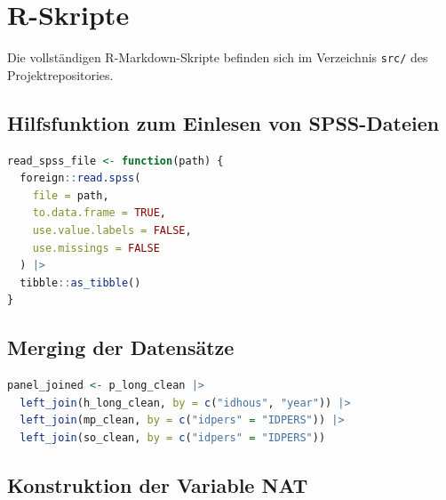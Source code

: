 

\chapter{R-Skripte}
\label{AppendixB}

Die vollständigen R-Markdown-Skripte befinden sich im Verzeichnis \texttt{src/} des
Projektrepositories.


\section{Hilfsfunktion zum Einlesen von SPSS-Dateien}
\label{sec:hilfsfunktion}

\begin{lstlisting}[language=R, caption={Einlesen einer SPSS-Datei}, label=lst:readspss]
read_spss_file <- function(path) {
  foreign::read.spss(
    file = path,
    to.data.frame = TRUE,
    use.value.labels = FALSE,
    use.missings = FALSE
  ) |>
  tibble::as_tibble()
}
\end{lstlisting}


\section{Merging der Datensätze}
\label{sec:merging}

\begin{lstlisting}[language=R, caption={Zusammenführung der vier Quelldateien}, label=lst:merging]
panel_joined <- p_long_clean |>
  left_join(h_long_clean, by = c("idhous", "year")) |>
  left_join(mp_clean, by = c("idpers" = "IDPERS")) |>
  left_join(so_clean, by = c("idpers" = "IDPERS"))
\end{lstlisting}


\section{Konstruktion der Variable NAT}
\label{sec:nat}


